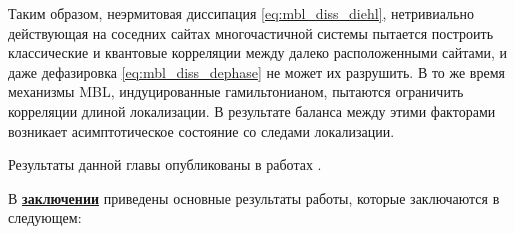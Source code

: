 Таким образом, неэрмитовая диссипация \cref{eq:mbl_diss_diehl}, нетривиально действующая на соседних сайтах многочастичной системы пытается построить классические и квантовые корреляции между далеко расположенными сайтами, и даже дефазировка \cref{eq:mbl_diss_dephase} не может их разрушить. 
В то же время механизмы MBL, индуцированные гамильтонианом, пытаются ограничить корреляции длиной локализации. 
В результате баланса между этими факторами возникает асимптотическое состояние со следами локализации. 

Результаты данной главы опубликованы в работах \cite{Yusipov2017, Vershinina2017, Yusipov2018, Vakulchyk2018, sessiann_2017, rf_2017, shilnikov_2017}.

\FloatBarrier
{}                                  %
В \underline{\textbf{заключении}} приведены основные результаты работы, которые заключаются в следующем:



